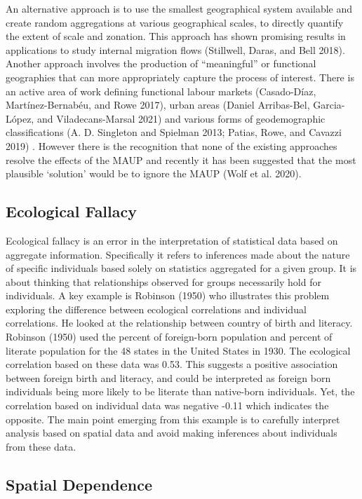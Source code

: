 \documentclass[
  letterpaper,
  DIV=11,
  numbers=noendperiod,
  oneside]{scrreprt}
\begin{document}
An alternative approach is to use the smallest geographical system
available and create random aggregations at various geographical scales,
to directly quantify the extent of scale and zonation. This approach has
shown promising results in applications to study internal migration
flows (Stillwell, Daras, and Bell 2018). Another approach involves the
production of ``meaningful'' or functional geographies that can more
appropriately capture the process of interest. There is an active area
of work defining functional labour markets (Casado-Díaz,
Martínez-Bernabéu, and Rowe 2017), urban areas (Daniel Arribas-Bel,
Garcia-López, and Viladecans-Marsal 2021) and various forms of
geodemographic classifications (A. D. Singleton and Spielman 2013;
Patias, Rowe, and Cavazzi 2019) . However there is the recognition that
none of the existing approaches resolve the effects of the MAUP and
recently it has been suggested that the most plausible `solution' would
be to ignore the MAUP (Wolf et al. 2020).

\subsection{Ecological Fallacy}\label{ecological-fallacy}

Ecological fallacy is an error in the interpretation of statistical data
based on aggregate information. Specifically it refers to inferences
made about the nature of specific individuals based solely on statistics
aggregated for a given group. It is about thinking that relationships
observed for groups necessarily hold for individuals. A key example is
Robinson (1950) who illustrates this problem exploring the difference
between ecological correlations and individual correlations. He looked
at the relationship between country of birth and literacy. Robinson
(1950) used the percent of foreign-born population and percent of
literate population for the 48 states in the United States in 1930. The
ecological correlation based on these data was 0.53. This suggests a
positive association between foreign birth and literacy, and could be
interpreted as foreign born individuals being more likely to be literate
than native-born individuals. Yet, the correlation based on individual
data was negative -0.11 which indicates the opposite. The main point
emerging from this example is to carefully interpret analysis based on
spatial data and avoid making inferences about individuals from these
data.

\subsection{Spatial Dependence}\label{spatial-dependence}
\end{document}
